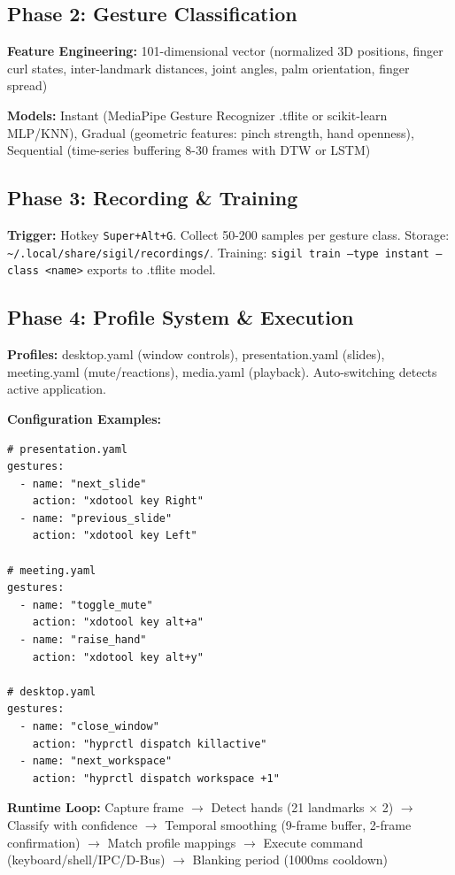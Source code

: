 \documentclass[11pt]{article}
\begin{document}
\subsection{Phase 2: Gesture Classification}

\textbf{Feature Engineering:} 101-dimensional vector (normalized 3D positions, finger curl states, inter-landmark distances, joint angles, palm orientation, finger spread)

\textbf{Models:} Instant (MediaPipe Gesture Recognizer .tflite or scikit-learn MLP/KNN), Gradual (geometric features: pinch strength, hand openness), Sequential (time-series buffering 8-30 frames with DTW or LSTM)

\subsection{Phase 3: Recording \& Training}

\textbf{Trigger:} Hotkey \texttt{Super+Alt+G}. Collect 50-200 samples per gesture class. Storage: \texttt{\textasciitilde/.local/share/sigil/recordings/}. Training: \texttt{sigil train --type instant --class <name>} exports to .tflite model.

\subsection{Phase 4: Profile System \& Execution}

\textbf{Profiles:} desktop.yaml (window controls), presentation.yaml (slides), meeting.yaml (mute/reactions), media.yaml (playback). Auto-switching detects active application.

\textbf{Configuration Examples:}

\begin{verbatim}
# presentation.yaml
gestures:
  - name: "next_slide"
    action: "xdotool key Right"
  - name: "previous_slide"
    action: "xdotool key Left"

# meeting.yaml
gestures:
  - name: "toggle_mute"
    action: "xdotool key alt+a"
  - name: "raise_hand"
    action: "xdotool key alt+y"

# desktop.yaml
gestures:
  - name: "close_window"
    action: "hyprctl dispatch killactive"
  - name: "next_workspace"
    action: "hyprctl dispatch workspace +1"
\end{verbatim}

\textbf{Runtime Loop:} Capture frame $\rightarrow$ Detect hands (21 landmarks × 2) $\rightarrow$ Classify with confidence $\rightarrow$ Temporal smoothing (9-frame buffer, 2-frame confirmation) $\rightarrow$ Match profile mappings $\rightarrow$ Execute command (keyboard/shell/IPC/D-Bus) $\rightarrow$ Blanking period (1000ms cooldown)
\end{document}
